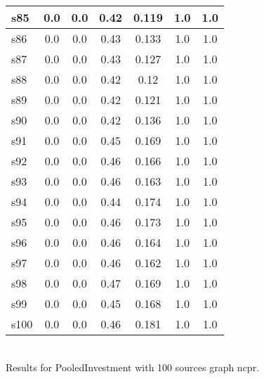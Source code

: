 \documentclass{article}
\begin{document}
\begin{tabular}{|l|c|c|c|c|c|c|}
\hline
s85 &0.0 & 0.0 & 0.42 & 0.119 & 1.0 & 1.0\\
\hline
s86 &0.0 & 0.0 & 0.43 & 0.133 & 1.0 & 1.0\\
\hline
s87 &0.0 & 0.0 & 0.43 & 0.127 & 1.0 & 1.0\\
\hline
s88 &0.0 & 0.0 & 0.42 & 0.12 & 1.0 & 1.0\\
\hline
s89 &0.0 & 0.0 & 0.42 & 0.121 & 1.0 & 1.0\\
\hline
s90 &0.0 & 0.0 & 0.42 & 0.136 & 1.0 & 1.0\\
\hline
s91 &0.0 & 0.0 & 0.45 & 0.169 & 1.0 & 1.0\\
\hline
s92 &0.0 & 0.0 & 0.46 & 0.166 & 1.0 & 1.0\\
\hline
s93 &0.0 & 0.0 & 0.46 & 0.163 & 1.0 & 1.0\\
\hline
s94 &0.0 & 0.0 & 0.44 & 0.174 & 1.0 & 1.0\\
\hline
s95 &0.0 & 0.0 & 0.46 & 0.173 & 1.0 & 1.0\\
\hline
s96 &0.0 & 0.0 & 0.46 & 0.164 & 1.0 & 1.0\\
\hline
s97 &0.0 & 0.0 & 0.46 & 0.162 & 1.0 & 1.0\\
\hline
s98 &0.0 & 0.0 & 0.47 & 0.169 & 1.0 & 1.0\\
\hline
s99 &0.0 & 0.0 & 0.45 & 0.168 & 1.0 & 1.0\\
\hline
s100 &0.0 & 0.0 & 0.46 & 0.181 & 1.0 & 1.0\\
\hline
\end{tabular}\\

\noindent Results for PooledInvestment with 100 sources graph ncpr.
\end{document}
